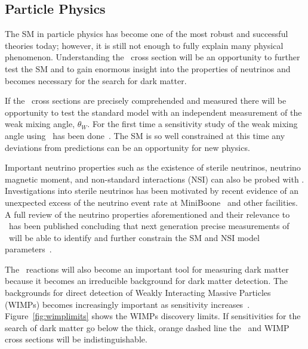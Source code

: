 \subsection{Particle Physics}

The SM in particle physics has become one of the most robust and successful theories today; however, it is still not enough to fully explain many physical phenomenon. Understanding the \cevns\ cross section will be an opportunity to further test the SM and to gain enormous insight into the properties of neutrinos and becomes necessary for the search for dark matter.

If the \cevns\ cross sections are  precisely comprehended and measured there will be opportunity to test the standard model with an independent measurement of the weak mixing angle, $\theta _W$. For the first time a sensitivity study of the weak mixing angle using \cevns\ has been done~\cite{papoulias:2018:coherent}. The SM is so well constrained at this time any deviations from predictions can be an opportunity for new physics.

Important neutrino properties such as the existence of sterile neutrinos, neutrino magnetic moment, and non-standard interactions (NSI) can also be probed with \cevns . Investigations into sterile neutrinos has been motivated by recent evidence of an unexpected excess of the neutrino event rate at MiniBoone~\cite{miniboone:2013:improved} and other facilities. A full review of the neutrino properties aforementioned and their relevance to \cevns\ has been published concluding that next generation precise measurements of \cevns\ will be able to identify and further constrain the SM and NSI model parameters~\cite{papoulias:2018:coherent}. 

The \cevns\ reactions will also become an important tool for measuring dark matter because it becomes an irreducible background for dark matter detection. The backgrounds for direct detection of Weakly Interacting Massive Particles (WIMPs) becomes increasingly important as sensitivity increases~\cite{billard:2014:implication}. Figure~\ref{fig:wimplimits} shows the WIMPs discovery limits. If sensitivities for the search of dark matter go below the thick, orange dashed line the \cevns\ and WIMP cross sections will be indistinguishable.

